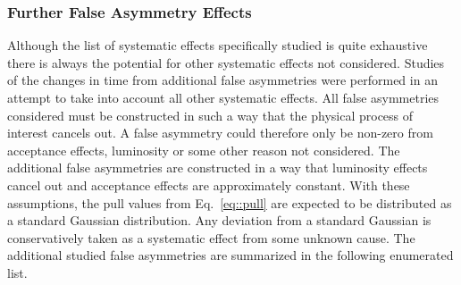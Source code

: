 \subsubsection{Further False Asymmetry Effects}
Although the list of systematic effects specifically studied is quite exhaustive
there is always the potential for other systematic effects not considered.
Studies of the changes in time from additional false asymmetries were performed
in an attempt to take into account all other systematic effects.  All false
asymmetries considered must be constructed in such a way that the physical
process of interest cancels out.  A false asymmetry could therefore only be
non-zero from acceptance effects, luminosity or some other reason not
considered.  The additional false asymmetries are constructed in a way that
luminosity effects cancel out and acceptance effects are approximately constant.
With these assumptions, the pull values from Eq.~\ref{eq::pull} are expected to
be distributed as a standard Gaussian distribution.  Any deviation from a
standard Gaussian is conservatively taken as a systematic effect from some
unknown cause.  The additional studied false asymmetries are summarized in the
following enumerated list.

